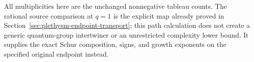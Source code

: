 All multiplicities here are the unchanged nonnegative tableau counts.
The rational source comparison at $q=1$ is the explicit map already
proved in Section~\ref{sec:plethysm-endpoint-transport}; this path
calculation does not create a generic quantum-group intertwiner or an
unrestricted complexity lower bound. It supplies the exact Schur
composition, signs, and growth exponents on the specified original
endpoint instead.
